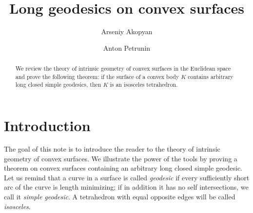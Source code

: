 \documentclass[oneside,a4paper, 12pt]{article}
\begin{document}
\title{Long geodesics on convex surfaces}
\author{Arseniy Akopyan
\and 
Anton Petrunin}
\newcommand{\Addresses}{{\bigskip\footnotesize

Arseniy Akopyan, 
\par\nopagebreak\textsc{Institute of Science and Technology Austria,} 
\par\nopagebreak\textsc{Am Campus 1, 3400 Klosterneuburg, Austria.}
\par\nopagebreak\textit{Email}: \texttt{akopjan@gmail.com}

\medskip

Anton Petrunin, 
\par\nopagebreak\textsc{Mathematics Department,} 
\par\nopagebreak\textsc{Pennsylvania State University,}
\par\nopagebreak\textsc{University Park, PA 16802, USA}
  \par\nopagebreak
  \textit{Email}: \texttt{petrunin@math.psu.edu}
}}
\date{}
\maketitle

\begin{abstract}
We review the theory of intrinsic geometry of convex surfaces in the Euclidean space and prove the following theorem: 
if the surface of a convex body $K$ contains arbitrary long closed simple geo\-de\-sics, then $K$ is an isosceles tetrahedron.
\end{abstract}


\section{Introduction}
The goal of this note is to introduce the reader to the theory of intrinsic geometry of convex surfaces.
We illustrate the power of the tools by proving a theorem on convex surfaces containing an arbitrary long closed simple geodesic. 
Let us remind that a curve in a surface is called \emph{geodesic} if every sufficiently short arc of the curve is length minimizing; if in addition it has no self intersections, we call it \emph{simple geodesic}.
A tetrahedron with equal opposite edges will be called \emph{isosceles}.
\end{document}
